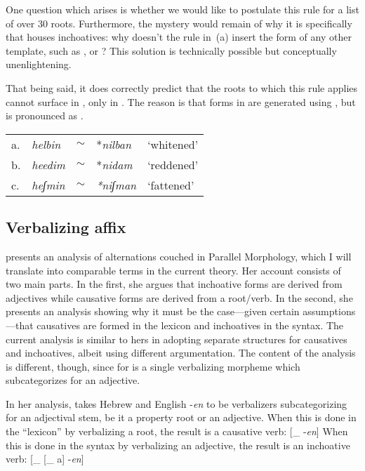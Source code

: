 One question which arises is whether we would like to postulate this rule for a list of over 30 roots. Furthermore, the mystery would remain of why it is specifically {\thif} that houses inchoatives: why doesn't the rule in~(\lastx a) insert the form of any other template, such as {\tkal}, {\tnif} or {\tpie}? This solution is technically possible but conceptually unenlightening.

That being said, it does correctly predict that the roots to which this rule applies cannot surface in {\tnif}, only in {\thit}. The reason is that forms in {\tnif} are generated using {\vz}, but {\vz} is pronounced as {\thif}.
\ex\label{ex:vd:allo-pred}
\begin{tabular}{lllll}
	a. & \emph{helbin} & $\sim$ & *\emph{nilban} & `whitened' \\
	b. & \emph{heedim} & $\sim$ & *\emph{nidam} & `reddened'\\
	c. & \emph{heʃmin} & $\sim$ & \emph{*niʃman} & `fattened'\\
\end{tabular}
\xe

	\subsection{Verbalizing affix} \label{vd:others:borer}
\cite{borer91} presents an analysis of {\thif} alternations couched in Parallel Morphology, which I will translate into comparable terms in the current theory. Her account consists of two main parts. In the first, she argues that inchoative forms are derived from adjectives while causative forms are derived from a root/verb. In the second, she presents an analysis showing why it must be the case---given certain assumptions---that causatives are formed in the lexicon and inchoatives in the syntax. The current analysis is similar to hers in adopting separate structures for causatives and inchoatives, albeit using different argumentation. The content of the analysis is different, though, since for \cite{borer91} {\thif} is a single verbalizing morpheme which subcategorizes for an adjective.

In her analysis, \citet[136]{borer91} takes Hebrew {\thif} and English -\emph{en} to be verbalizers subcategorizing for an adjectival stem, be it a property root or an adjective. %
When this is done in the ``lexicon'' by verbalizing a root, the result is a causative verb:
\ex\label{ex:vd:thif-borer-caus}{[}_{}  -\emph{en}]
\xe
When this is done in the syntax by verbalizing an adjective, the result is an inchoative verb:
\ex\label{ex:vd:thif-borer-inch}{[}_{} [_{}  a] -\emph{en}]
\xe

